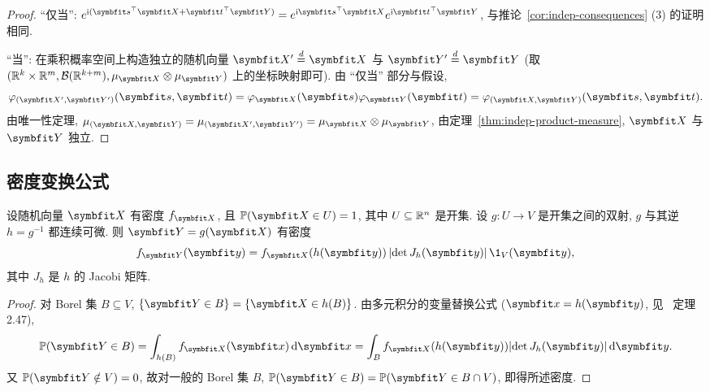 \begin{proof}
``仅当'': $e^{\mathrm{i}(\rvec{s}^\T\rvec{X}+\rvec{t}^\T\rvec{Y})}=e^{\mathrm{i}\rvec{s}^\T\rvec{X}}e^{\mathrm{i}\rvec{t}^\T\rvec{Y}}$, 与推论~\ref{cor:indep-consequences} (3) 的证明相同.

``当'': 在乘积概率空间上构造独立的随机向量 $\rvec{X}'\overset{d}{=}\rvec{X}$ 与 $\rvec{Y}'\overset{d}{=}\rvec{Y}$ (取 $(\R^k\times\R^m,\mathcal{B}(\R^{k+m}),\mu_{\rvec{X}}\otimes\mu_{\rvec{Y}})$ 上的坐标映射即可). 由 ``仅当'' 部分与假设,
\[
\varphi_{(\rvec{X}',\rvec{Y}')}(\rvec{s},\rvec{t})=\varphi_{\rvec{X}}(\rvec{s})\varphi_{\rvec{Y}}(\rvec{t})=\varphi_{(\rvec{X},\rvec{Y})}(\rvec{s},\rvec{t}).
\]
由唯一性定理, $\mu_{(\rvec{X},\rvec{Y})}=\mu_{(\rvec{X}',\rvec{Y}')}=\mu_{\rvec{X}}\otimes\mu_{\rvec{Y}}$, 由定理~\ref{thm:indep-product-measure}, $\rvec{X}$ 与 $\rvec{Y}$ 独立.
\end{proof}

\subsection{密度变换公式}

\begin{theorem}[密度变换公式]\label{thm:jacobian}
设随机向量 $\rvec{X}$ 有密度 $f_{\rvec{X}}$, 且 $\P(\rvec{X}\in U)=1$, 其中 $U\subseteq\mathbb{R}^n$ 是开集. 设 $g:U\to V$ 是开集之间的双射, $g$ 与其逆 $h=g^{-1}$ 都连续可微. 则 $\rvec{Y}=g(\rvec{X})$ 有密度
\[
f_{\rvec{Y}}(\rvec{y})=f_{\rvec{X}}(h(\rvec{y}))\,\abs{\det J_h(\rvec{y})}\,\1_V(\rvec{y}),
\]
其中 $J_h$ 是 $h$ 的 Jacobi 矩阵.
\end{theorem}

\begin{proof}
对 Borel 集 $B\subseteq V$, $\{\rvec{Y}\in B\}=\{\rvec{X}\in h(B)\}$. 由多元积分的变量替换公式 ($\rvec{x}=h(\rvec{y})$, 见~\cite{folland} 定理 2.47),
\[
\P(\rvec{Y}\in B)=\int_{h(B)}f_{\rvec{X}}(\rvec{x})\dd\rvec{x}=\int_B f_{\rvec{X}}(h(\rvec{y}))\abs{\det J_h(\rvec{y})}\dd\rvec{y}.
\]
又 $\P(\rvec{Y}\notin V)=0$, 故对一般的 Borel 集 $B$, $\P(\rvec{Y}\in B)=\P(\rvec{Y}\in B\cap V)$, 即得所述密度.
\end{proof}


